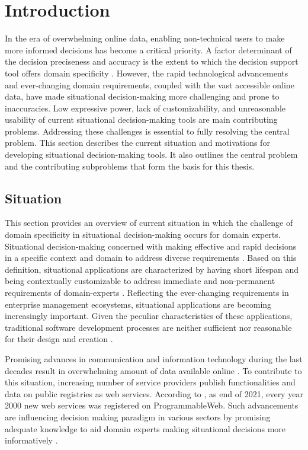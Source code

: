 \hypertarget{sec:introduction}{%
\chapter{Introduction}\label{sec:introduction}}
In the era of overwhelming online data, enabling non-technical users to
make more informed decisions has become a critical priority. A factor
determinant of the decision preciseness and accuracy is the extent to
which the decision support tool offers domain specificity \autocite{Zhu2022}. However, the rapid technological advancements and
ever-changing domain requirements, coupled with the vast accessible
online data, have made situational decision-making more challenging and
prone to inaccuracies. Low expressive power, lack of customizability,
and unreasonable usability of current situational decision-making tools
are main contributing problems. Addressing these challenges is essential
to fully resolving the central problem. This section describes the
current situation and motivations for developing situational
decision-making tools. It also outlines the central problem and the
contributing subproblems that form the basis for this thesis. 


\vspace{-15pt}
\hypertarget{sec:situation}{%
\section{Situation}\label{sec:situation}}
\vspace{15pt}

This section provides an overview of current situation in which the
challenge of domain specificity in situational decision-making occurs
for domain experts. Situational decision-making concerned with making
effective and rapid decisions in a specific context and domain to
address diverse requirements \autocite{Hagele2021}. Based
on this definition, situational applications are characterized by having
short lifespan and being contextually customizable to address immediate
and non-permanent requirements of domain-experts \autocite{Pahlke2010}. Reflecting the ever-changing requirements in enterprise
management ecosystems, situational applications are becoming
increasingly important. Given the peculiar characteristics of these
applications, traditional software development processes are neither
sufficient nor reasonable for their design and creation \autocite{Casati2012}.

Promising advances in communication and information technology during
the last decades result in overwhelming amount of data available online
\autocite{Noran2018}. To contribute to this situation, increasing
number of service providers publish functionalities and data on public
registries as web services. According to \autocite{Zarei2021}, as end
of 2021, every year 2000 new web services was registered on
ProgrammableWeb. Such advancements are influencing decision making
paradigm in various sectors by promising adequate knowledge to aid
domain experts making situational decisions more informatively \autocite{Noran2018}.

